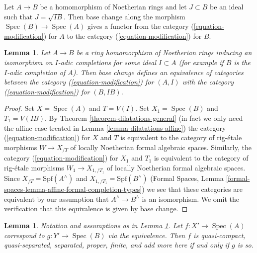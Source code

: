 \documentclass{stacks-project}
\theoremstyle{plain}
\newtheorem{lemma}[subsection]{Lemma}
\theoremstyle{definition}
\theoremstyle{remark}
\numberwithin{equation}{subsection}
\def\Spec{\mathop{\mathrm{Spec}}}
\begin{document}
\medskip\noindent
Let $A \to B$ be a homomorphism of Noetherian rings and let $J \subset B$
be an ideal such that $J = \sqrt{I B}$. Then base
change along the morphism $\Spec(B) \to \Spec(A)$ gives a functor
from the category (\ref{equation-modification}) for $A$
to the category (\ref{equation-modification}) for $B$.

\begin{lemma}
\label{lemma-Noetherian-local-ring}
Let $A \to B$ be a ring homomorphism of Noetherian rings inducing an
isomorphism on $I$-adic completions for some ideal $I \subset A$
(for example if $B$ is the $I$-adic completion of $A$).
Then base change defines an equivalence of categories between the
category (\ref{equation-modification}) for $(A, I)$
with the category (\ref{equation-modification}) for $(B, IB)$.
\end{lemma}

\begin{proof}
Set $X = \Spec(A)$ and $T = V(I)$.
Set $X_1 = \Spec(B)$ and $T_1 = V(IB)$.
By Theorem \ref{theorem-dilatations-general} (in fact we only need
the affine case treated in Lemma \ref{lemma-dilatations-affine})
the category (\ref{equation-modification}) for $X$ and $T$
is equivalent to the category of rig-\'etale morphisms
$W \to X_{/T}$ of locally Noetherian formal algebraic spaces.
Similarly, the category (\ref{equation-modification})
for $X_1$ and $T_1$ is equivalent to the category of rig-\'etale
morphisms $W_1 \to X_{1, /T_1}$ of locally Noetherian formal
algebraic spaces. Since $X_{/T} = \text{Spf}(A^\wedge)$
and $X_{1, /T_1} = \text{Spf}(B^\wedge)$ (Formal Spaces, Lemma
\ref{formal-spaces-lemma-affine-formal-completion-types}) we see that
these categories are equivalent by our assumption that
$A^\wedge \to B^\wedge$ is an isomorphism. We omit the verification
that this equivalence is given by base change.
\end{proof}

\begin{lemma}
\label{lemma-Noetherian-local-ring-properties}
Notation and assumptions as in Lemma \ref{lemma-Noetherian-local-ring}.
Let $f : X' \to \Spec(A)$ correspond to $g : Y' \to \Spec(B)$
via the equivalence. Then $f$ is quasi-compact, quasi-separated, separated,
proper, finite, and add more here if and only if $g$ is so.
\end{lemma}
\end{document}
